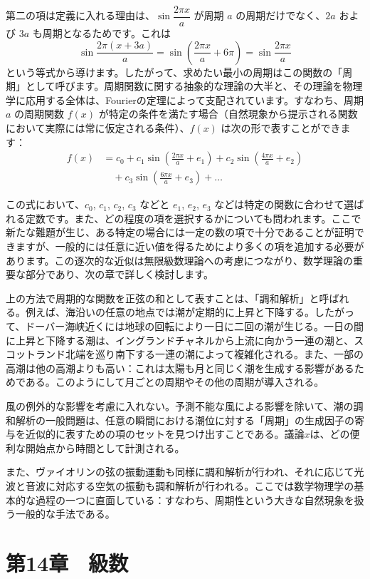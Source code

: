 \documentclass[a4paper,11pt,openany]{ltjsbook}
\begin{document}
第二の項は定義に入れる理由は、$\sin \dfrac{2\pi x}{a}$ が周期 $a$ の周期だけでなく、$2a$ および $3a$ も周期となるためです。これは
\[
\sin \frac{2\pi (x + 3a)}{a}
  = \sin \left(\frac{2\pi x}{a} + 6\pi\right)
  = \sin \frac{2\pi x}{a}
\]
という等式から導けます。したがって、求めたい最小の周期はこの関数の「周期」として呼びます。周期関数に関する抽象的な理論の大半と、その理論を物理学に応用する全体は、Fourierの定理によって支配されています。すなわち、周期 $a$ の周期関数 $f(x)$ が特定の条件を満たす場合（自然現象から提示される関数において実際には常に仮定される条件）、$f(x)$ は次の形で表すことができます：
\begin{align*}
f(x) &= c_0 + c_1 \sin \left(\frac{2\pi x}{a} + e_1\right) + c_2 \sin \left(\frac{4\pi x}{a} + e_2\right) \\
     &\quad + c_3 \sin \left(\frac{6\pi x}{a} + e_3\right) + \dots
\end{align*}


この式において、$c_{0}$, $c_{1}$, $c_{2}$, $c_{3}$ などと $e_{1}$, $e_{2}$, $e_{3}$ などは特定の関数に合わせて選ばれる定数です。また、どの程度の項を選択するかについても問われます。ここで新たな難題が生じ、ある特定の場合には一定の数の項で十分であることが証明できますが、一般的には任意に近い値を得るためにより多くの項を追加する必要があります。この逐次的な近似は無限級数理論への考慮につながり、数学理論の重要な部分であり、次の章で詳しく検討します。

上の方法で周期的な関数を正弦の和として表すことは、「調和解析」と呼ばれる。例えば、海沿いの任意の地点では潮が定期的に上昇と下降する。したがって、ドーバー海峡近くには地球の回転により一日に二回の潮が生じる。一日の間に上昇と下降する潮は、イングランドチャネルから上流に向かう一連の潮と、スコットランド北端を巡り南下する一連の潮によって複雑化される。また、一部の高潮は他の高潮よりも高い：これは太陽も月と同じく潮を生成する影響があるためである。このようにして月ごとの周期やその他の周期が導入される。

風の例外的な影響を考慮に入れない。予測不能な風による影響を除いて、潮の調和解析の一般問題は、任意の瞬間における潮位に対する「周期」の生成因子の寄与を近似的に表すための項のセットを見つけ出すことである。議論$x$は、どの便利な開始点から時間として計測される。

また、ヴァイオリンの弦の振動運動も同様に調和解析が行われ、それに応じて光波と音波に対応する空気の振動も調和解析が行われる。ここでは数学物理学の基本的な過程の一つに直面している：すなわち、周期性という大きな自然現象を扱う一般的な手法である。

\chapter{第14章　級数}
\end{document}
